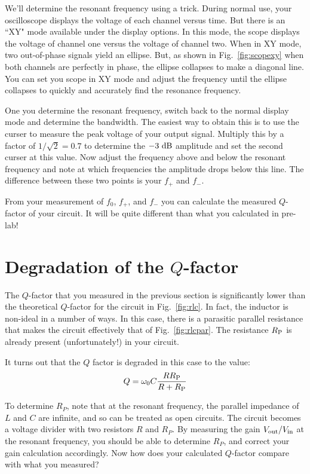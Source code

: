 \documentclass[12pt]{article}
\begin{document}
We'll determine the resonant frequency using a trick.  During normal use, your oscilloscope displays the voltage of each channel versus time.  But there is an ``XY" mode available under the display options.  In this mode, the scope displays the voltage of channel one versus the voltage of channel two.  When in XY mode, two out-of-phase signals yield an ellipse.  But, as shown in Fig.~\ref{fig:scopexy} when both channels are perfectly in phase, the ellipse collapses to make a diagonal line.  You can set you scope in XY mode and adjust the frequency until the ellipse collapses to quickly and accurately find the resonance frequency.

One you determine the resonant frequency, switch back to the normal display mode and determine the bandwidth.  The easiest way to obtain this is to use the curser to measure the peak voltage of your output signal.  Multiply this by a factor of $1/\sqrt{2} = 0.7$ to determine the $-3~\rm dB$ amplitude and set the second curser at this value.  Now adjust the frequency above and below the resonant frequency and note at which frequencies the amplitude drops below this line.  The difference between these two points is your $f_+$ and $f_-$.

From your measurement of $f_0$, $f_+$, and $f_-$ you can calculate the measured $Q$-factor of your circuit.  It will be quite different than what you calculated in pre-lab! 

\section{Degradation of the $Q$-factor}

The $Q$-factor that you measured in the previous section is significantly lower than the theoretical $Q$-factor for the circuit in Fig.~\ref{fig:rlc}.  In fact, the inductor is non-ideal in a number of ways.  In this case, there is a parasitic parallel resistance that makes the circuit effectively that of Fig.~\ref{fig:rlcpar}.  The resistance $R_{\rm P}$ is already present (unfortunately!) in your circuit.  

It turns out that the $Q$ factor is degraded in this case to the value:
\begin{equation}
Q = \omega_0 C \frac{R R_{\rm P}}{R+R_{\rm P}}
\end{equation}

To determine $R_P$, note that at the resonant frequency, the parallel impedance of $L$ and $C$ are infinite, and so can be treated as open circuits.  The circuit becomes a voltage divider with two resistors $R$ and $R_P$.  By measuring the gain $V_{\rm out}/V_{\rm in}$ at the resonant frequency, you should be able to determine $R_P$, and correct your gain calculation accordingly.  Now how does your calculated $Q$-factor compare with what you measured?
\end{document}
